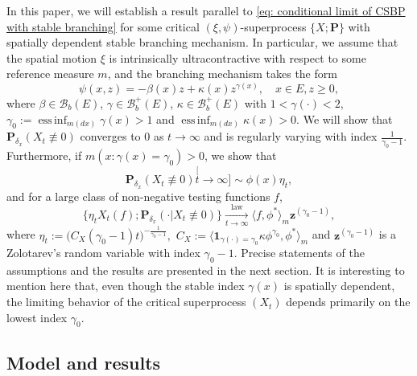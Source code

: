 \documentclass[12pt, a4paper]{amsart}
\theoremstyle{definition}
\numberwithin{equation}{section}
\begin{document}
In this paper, we will establish a result parallel
	to \eqref{eq: conditional limit of CSBP with stable branching} for some 
   critical $(\xi,\psi)$-superprocess $\{X; \mathbf P\}$ 
	with spatially dependent stable branching mechanism.
	In particular, we assume that the spatial motion $\xi$ is intrinsically ultracontractive with respect to some reference measure $m$, and the branching mechanism takes the form
\[
	\psi(x,z) = -\beta (x) z + \kappa(x) z^{\gamma(x)},
	\quad x\in E, z \geq 0,
\]
	where $\beta \in \mathscr B_b(E)$, $\gamma \in \mathscr B^+_b(E)$, $\kappa \in \mathscr B^+_b(E)$ with $1< \gamma(\cdot )<2$, $\gamma_0 := \operatorname{ess\,inf}_{m(dx)} \gamma(x)> 1$ and $\operatorname{ess\,inf}_{m(dx)}\kappa(x) > 0$.
	We will show that $\mathbf P_{\delta_x}( X_t \not \equiv 0) $ converges to $0$ as $t\to \infty$ and 
	is regularly varying with index $\frac{1}{\gamma_0 - 1}$.
	Furthermore, if $m(x: \gamma(x) = \gamma_0)>0$, we show that
\[
	\mathbf P_{\delta_x}( X_t \not \equiv 0)
	\stackrel[t\to \infty]{}{\sim} \phi(x) \eta_t,
\]
	and for a large class of non-negative testing functions $f$,
\[\label{eq: result2}
	\{   \eta_t X_t(f) ; \mathbf P_{\delta_x}(\cdot | X_t \not \equiv 0) \}
	\xrightarrow[t\to \infty]{\operatorname{law}}
	\langle f, \phi^*\rangle_m \mathbf z^{(\gamma_0 - 1)},
\]
	where $\eta_t := \big( C_X(\gamma_0 - 1) t \big)^{- \frac {1} {\gamma_0 - 1} },$ $C_X := \langle \mathbf 1_{\gamma(\cdot) = \gamma_0} \kappa \phi^{\gamma_0}, \phi^* \rangle_m$ and $\mathbf z^{(\gamma_0 - 1)}$ is a Zolotarev's random variable with index $\gamma_0 - 1$.
	Precise statements of the assumptions and the results are presented in the next 
	section.
    It is interesting to mention here that, even though the stable index $\gamma(x)$ is spatially dependent, the limiting behavior of the critical superprocess $(X_t)$ 
    depends primarily on the lowest index $\gamma_0$.
	
\subsection{Model and results}
\end{document}
